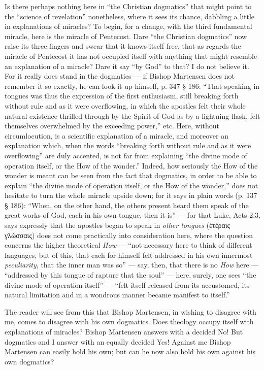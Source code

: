 \documentclass[12pt]{book}
\newcommand{\opage}[1]{\marginnote{\footnotesize\textit{[#1]}}}
\begin{document}
Is there perhaps nothing here in ``the Christian dogmatics'' that might point to the ``science of revelation'' nonetheless, where it sees its chance, dabbling a little in explanations of miracles? To begin, for a change, with the third fundamental miracle, here is the miracle of Pentecost. Dare ``the Christian dogmatics'' now raise its three fingers and swear that it knows itself free, that as regards the miracle of Pentecost it has not occupied itself with anything that might resemble an explanation of a miracle? Dare it say ``by God'' to that? I do not believe it. For it really does stand in the dogmatics --- if Bishop Martensen does not remember it so exactly, he can look it up himself, p. 347 § 186: ``That speaking in tongues was thus the expression of the first enthusiasm, still breaking forth without rule and as it were overflowing, in which the apostles felt their whole natural existence thrilled through by the Spirit of God as by a lightning flash, felt themselves overwhelmed by the exceeding power,'' etc. Here, without circumlocution, is a scientific explanation of a miracle, and moreover an explanation which, when the words ``breaking forth without rule and as it were overflowing'' are duly accented, is not far from explaining ``the divine mode of operation itself, or the How of the wonder.'' Indeed, how seriously the How of the wonder is meant can be seen from the fact that dogmatics, in order to be able to explain ``the divine mode of operation itself, or the How of the wonder,'' does not hesitate to turn the whole miracle upside down; for it says in plain words (p. 137 § 186): ``When, on the other hand, the others present heard them speak of the great works of God, each in his own tongue, then it is'' --- for that Luke, Acts 2:3, says expressly that the apostles began to speak in \emph{other tongues} (ἑτέραις γλώσσαις) does not come practically into consideration here, where the question concerns the higher theoretical \emph{How} ---
\opage{87}\setcounter{footnote}{0}%
``not necessary here to think of different languages, but of this, that each for himself felt addressed in his own innermost \emph{peculiarity}, that the inner man was so'' --- say, then, that there is no \emph{How} here --- ``addressed by this tongue of rapture that the soul'' --- here, surely, one sees ``the divine mode of operation itself'' --- ``felt itself released from its accustomed, its natural limitation and in a wondrous manner became manifest to itself.''

The reader will see from this that Bishop Martensen, in wishing to disagree with me, comes to disagree with his own dogmatics. Does theology occupy itself with explanations of miracles? Bishop Martensen answers with a decided No! But dogmatics and I answer with an equally decided Yes! Against me Bishop Martensen can easily hold his own; but can he now also hold his own against his own dogmatics?
\end{document}

